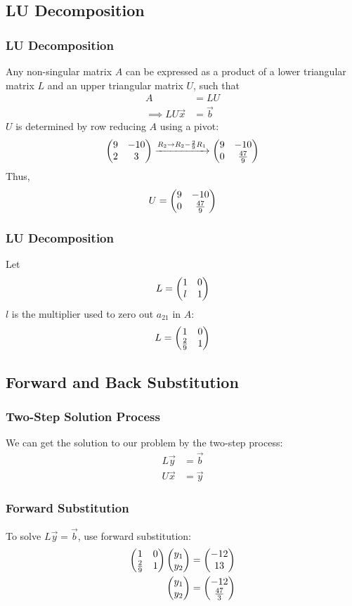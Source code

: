 \documentclass{beamer}
\begin{document}
\subsection{LU Decomposition}
\begin{frame}
\frametitle{LU Decomposition}
Any non-singular matrix $A$ can be expressed as a product of a lower triangular matrix $L$ and an upper triangular matrix $U$, such that
\begin{align}
    A &= LU\\
    \implies LU\vec{x} &= \vec{b}
\end{align}
$U$ is determined by row reducing $A$ using a pivot:
\begin{align}
    \begin{pmatrix}9 & -10\\2 & 3\end{pmatrix} \xrightarrow{R_2 \to R_2 - \frac{2}{9}R_1} \begin{pmatrix}9 & -10\\0 & \frac{47}{9}\end{pmatrix}
\end{align}
Thus,
\begin{align}
    U = \begin{pmatrix}9 & -10\\0 & \frac{47}{9}\end{pmatrix}
\end{align}
\end{frame}

\begin{frame}
\frametitle{LU Decomposition}
Let 
\begin{align}
    L = \begin{pmatrix}1 & 0\\l & 1\end{pmatrix}
\end{align}
$l$ is the multiplier used to zero out $a_{21}$ in $A$:
\begin{align}
    L = \begin{pmatrix}1 & 0\\ \frac{2}{9} & 1\end{pmatrix}
\end{align}
\end{frame}

\subsection{Forward and Back Substitution}
\begin{frame}
\frametitle{Two-Step Solution Process}
We can get the solution to our problem by the two-step process:
\begin{align}
    L\vec{y} &= \vec{b}\\
    U\vec{x} &= \vec{y}
\end{align}
\end{frame}

\begin{frame}
\frametitle{Forward Substitution}
To solve $L\vec{y} = \vec{b}$, use forward substitution:
\begin{align}
    \begin{pmatrix}1 & 0\\ \frac{2}{9} & 1\end{pmatrix}\begin{pmatrix}y_1 \\ y_2\end{pmatrix} &= \begin{pmatrix}-12 \\ 13\end{pmatrix}\\
    \begin{pmatrix}y_1 \\ y_2\end{pmatrix} &= \begin{pmatrix}-12 \\ \frac{47}{3}\end{pmatrix}
\end{align}
\end{frame}
\end{document}
